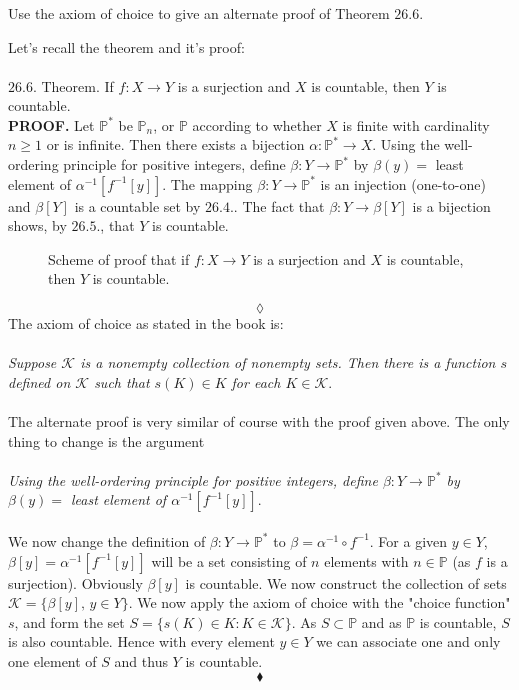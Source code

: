 \subsubsection{}
\begin{tcolorbox}
Use the axiom of choice to give an alternate proof of Theorem $\mathbf{26.6}$. 

\end{tcolorbox}
Let's recall the theorem and it's proof:\\\\
$\mathbf{26.6.}$ Theorem. If $f: X \rightarrow Y$ is a surjection and $X$ is countable, then $Y$ is countable. \\
\textbf{PROOF.} Let $\mathbb{P}^*$ be $\mathbb{P}_n$, or $\mathbb{P}$ according to whether $X$ is finite with cardinality $n\ge 1$ or is infinite. Then there exists a bijection $\alpha: \mathbb{P}^* \rightarrow X$. Using the well-ordering principle for positive integers, define $\beta:Y\rightarrow \mathbb{P}^*$ by $\beta(y) = $ least element of $\alpha^{-1}\left [f^{-1}[y]\right]$. The mapping $\beta:Y\rightarrow \mathbb{P}^*$  is an injection (one-to-one) and $\beta[Y]$ is a countable set by $\mathbf{26.4.}$.  The fact that $\beta: Y\rightarrow \beta[Y]$ is a bijection shows, by $\mathbf{ 26.5.}$, that $Y$ is countable. 
\begin{figure}[H]%
    \centering
    
\caption{Scheme of proof that if $f:X\rightarrow Y$ is a surjection and $X$ is countable, then $Y$ is countable.}
\label{fig:fig_p8b}
\end{figure}
$$\lozenge$$
The axiom of choice as stated in the book is:\\\\
\textit{Suppose $\mathscr{K}$ is a nonempty collection of nonempty sets. Then there is a function $s$ defined on $\mathscr{K}$ such that $s(K)\in K$ for each $K\in \mathscr{K}$}.\\\\
The alternate proof is very similar of course with the proof given above. The only thing to change is the argument\\\\
\textit{Using the well-ordering principle for positive integers, define $\beta:Y\rightarrow \mathbb{P}^*$ by $\beta(y) = $ least element of $\alpha^{-1}\left [f^{-1}[y]\right]$}. 
\\\\
We now change the definition of $\beta:Y\rightarrow \mathbb{P}^{*}$ to $\beta = \alpha^{-1 }\circ f^{-1}$. For a given $y\in Y$, $\beta[y] = \alpha^{-1}\left [f^{-1}[y]\right]$ will be a set consisting of $n$ elements with $n\in \mathbb{P}$ (as $f$ is a surjection). Obviously $\beta[y]$ is countable.  We now construct the collection of sets $\mathscr{K}=\{\beta[y], \, y\in Y\}$. We now apply the axiom of choice with the "choice function" $s$, and form the set $S=\{s(K)\in K:K\in \mathscr{K}\}$. As $S\subset \mathbb{P}$ and as $ \mathbb{P}$ is countable, $S$ is also countable. Hence with every element $y\in Y$ we can associate one and only one element of $S$ and thus $Y$ is countable.
$$\blacklozenge$$

